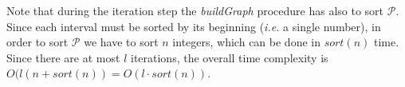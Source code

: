 \documentclass[runningheads,envcountsame,a4paper]{llncs}
\newcommand{\ie}{\textit{i.e.}\xspace}
\begin{document}
\begin{comment}
times the procedures ExtendQonLeft and ExtendQonRight.
In fact, those two procedures
apply the backward extension to every $Q$-interval in $\mathcal{Q}_j$ at
most $l$ times, since there can't be any interval related to a pattern
$Q$ such that $|Q| > l$. %

On the other hand the procedures ExtendQonLeft and ExtendQonRight aim to
build all the possible $Q$-intervals linked to the maximal overlaps
between the reads (the irreducible edges of the String Graph) by means of
an incremental approach that rely on the computation of the
$Q$-intervals during the previous steps.

Thus, the time complexity of these procedures may be measured by
considering the total number of possible $Q$-intervals that we have to
compute for every length of $Q$ (more precisely for $|Q| \in \{1 \dots
l\}$).

Then the total  complexity of ExtendQonLeft and ExtendQonRight is at
most $O(N_Q)$, where $N_Q$ is the total number of
$Q$-intervals (i.e. distinct substrings of $R$).

An estimate of $N_Q$ can be given as $O(l \times n)$ (let us recall that
the number of distinct strings in a word on length $x$ is  at most $x$
((Trovare articolo e citare)\cite{})).
\end{comment}

Note that during the iteration step the \emph{buildGraph} procedure has also to
sort $\mathcal{P}$. Since each interval must be sorted by its beginning (\ie a
single number), in order to sort  $\mathcal{P}$ we have to sort $n$ integers,
which can be done in $sort(n)$ time.
%
Since there are at most $l$ iterations, the overall time complexity is
$O(l (n + sort(n))=O(l \cdot sort(n))$.
\end{document}

